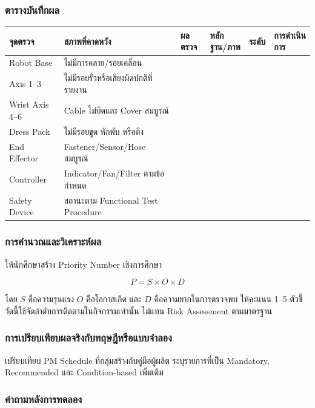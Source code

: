 \subsubsection{ตารางบันทึกผล}

\begin{table}[htbp]
    \centering
    \begin{tabular}{l l l l l l}
        \hline
        \textbf{จุดตรวจ} & \textbf{สภาพที่คาดหวัง} & \textbf{ผลตรวจ} & \textbf{หลักฐาน/ภาพ} & \textbf{ระดับ} & \textbf{การดำเนินการ} \\
        \hline
        Robot Base & ไม่มีการคลาย/รอยเคลื่อน &  &  &  &  \\
        Axis 1–3 & ไม่มีรอยรั่วหรือเสียงผิดปกติที่รายงาน &  &  &  &  \\
        Wrist Axis 4–6 & Cable ไม่บิดและ Cover สมบูรณ์ &  &  &  &  \\
        Dress Pack & ไม่มีรอยขูด หักพับ หรือตึง &  &  &  &  \\
        End Effector & Fastener/Sensor/Hose สมบูรณ์ &  &  &  &  \\
        Controller & Indicator/Fan/Filter ตามข้อกำหนด &  &  &  &  \\
        Safety Device & สถานะตาม Functional Test Procedure &  &  &  &  \\
        \hline
    \end{tabular}
\end{table}

\subsubsection{การคำนวณและวิเคราะห์ผล}

ให้นักศึกษาสร้าง Priority Number เชิงการศึกษา

\[
P=S\times O\times D
\]

โดย $S$ คือความรุนแรง $O$ คือโอกาสเกิด และ $D$ คือความยากในการตรวจพบ ให้คะแนน 1–5 ตัวชี้วัดนี้ใช้จัดลำดับการติดตามในกิจกรรมเท่านั้น ไม่แทน Risk Assessment ตามมาตรฐาน

\subsubsection{การเปรียบเทียบผลจริงกับทฤษฎีหรือแบบจำลอง}

เปรียบเทียบ PM Schedule ที่กลุ่มสร้างกับคู่มือผู้ผลิต ระบุรายการที่เป็น Mandatory, Recommended และ Condition-based เพิ่มเติม

\subsubsection{คำถามหลังการทดลอง}

